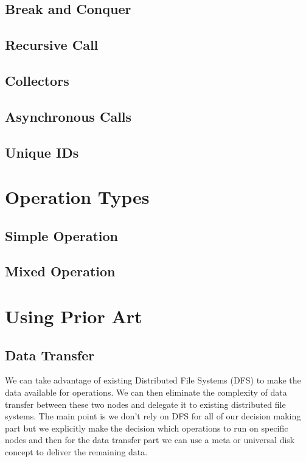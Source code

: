 \subsection{Break and Conquer}
\subsection{Recursive Call}
\subsection{Collectors}
\subsection{Asynchronous Calls}
\subsection{Unique IDs}


\section{Operation Types}
\subsection{Simple Operation}
\subsection{Mixed Operation}

\section{Using Prior Art}
\subsection{Data Transfer}
We can take advantage of existing Distributed File Systems
(DFS) to make the data available for operations. We can then eliminate
the complexity of data transfer between these two nodes and delegate it
to existing distributed file systems. The main point is we don't rely on
DFS for all of our decision making part but we explicitly make the 
decision which operations to run on specific nodes and then for the 
data transfer part we can use a meta or universal disk concept to deliver the
remaining data.